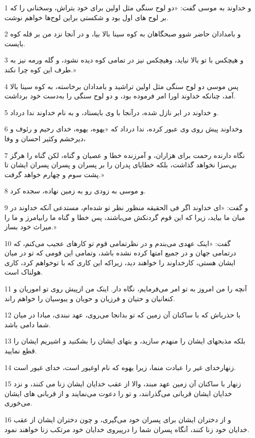 \par 1 و خداوند به موسی گفت: «دو لوح سنگی مثل اولین برای خود بتراش، وسخنانی را که بر لوح های اول بود و شکستی براین لوح‌ها خواهم نوشت.
\par 2 و بامدادان حاضر شوو صبحگاهان به کوه سینا بالا بیا، و در آنجا نزد من بر قله کوه بایست.
\par 3 و هیچکس با تو بالا نیاید، وهیچکس نیز در تمامی کوه دیده نشود، و گله ورمه نیز به طرف این کوه چرا نکند.»
\par 4 پس موسی دو لوح سنگی مثل اولین تراشید و بامدادان برخاسته، به کوه سینا بالا آمد، چنانکه خداوند اورا امر فرموده بود، و دو لوح سنگی را به‌دست خود برداشت.
\par 5 و خداوند در ابر نازل شده، درآنجا با وی بایستاد، و به نام خداوند ندا درداد.
\par 6 وخداوند پیش روی وی عبور کرده، ندا درداد که «یهوه، یهوه، خدای رحیم و رئوف و دیرخشم وکثیر احسان و وفا،
\par 7 نگاه دارنده رحمت برای هزاران، و آمرزنده خطا و عصیان و گناه، لکن گناه را هرگز بی‌سزا نخواهد گذاشت، بلکه خطایای پدران را بر پسران و پسران پسران ایشان تا پشت سوم و چهارم خواهد گرفت.»
\par 8 و موسی به زودی رو به زمین نهاده، سجده کرد.
\par 9 و گفت: «ای خداوند اگر فی الحقیقه منظور نظر تو شده‌ام، مستدعی آنکه خداوند در میان ما بیاید، زیرا که این قوم گردنکش می‌باشند، پس خطا و گناه ما رابیامرز و ما را میراث خود بساز.»
\par 10 گفت: «اینک عهدی می‌بندم و در نظرتمامی قوم تو کارهای عجیب می‌کنم، که درتمامی جهان و در جمیع امتها کرده نشده باشد، وتمامی این قومی که تو در میان ایشان هستی، کارخداوند را خواهند دید، زیراکه این کاری که با توخواهم کرد، کاری هولناک است.
\par 11 آنچه را من امروز به تو امر می‌فرمایم، نگاه دار. اینک من ازپیش روی تو اموریان و کنعانیان و حتیان و فرزیان و حویان و یبوسیان را خواهم راند.
\par 12 با حذرباش که با ساکنان آن زمین که تو بدانجا می‌روی، عهد نبندی، مبادا در میان شما دامی باشد.
\par 13 بلکه مذبحهای ایشان را منهدم سازید، و بتهای ایشان را بشکنید و اشیریم ایشان را قطع نمایید.
\par 14 زنهارخدای غیر را عبادت منما، زیرا یهوه که نام اوغیور است، خدای غیور است.
\par 15 زنهار با ساکنان آن زمین عهد مبند، والا از عقب خدایان ایشان زنا می کنند، و نزد خدایان ایشان قربانی می‌گذرانند، و تو را دعوت می‌نمایند و از قربانی های ایشان می‌خوری.
\par 16 و از دختران ایشان برای پسران خود می‌گیری، و چون دختران ایشان از عقب خدایان خود زنا کنند، آنگاه پسران شما را درپیروی خدایان خود مرتکب زنا خواهند نمود.
